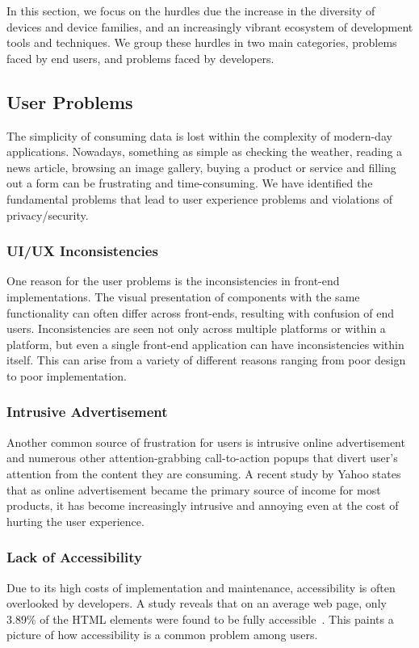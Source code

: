 In this section, we focus on the hurdles due the increase in the diversity of devices and device families, and an increasingly vibrant ecosystem of development tools and techniques. We group these hurdles in two main categories, problems faced by end users, and problems faced by developers.

\subsection{User Problems}

The simplicity of consuming data is lost within the complexity of modern-day applications. Nowadays, something as simple as checking the weather, reading a news article, browsing an image gallery, buying a product or service and filling out a form can be frustrating and time-consuming. We have identified the fundamental problems that lead to user experience problems and violations of privacy/security.

\subsubsection{UI/UX Inconsistencies}
One reason for the user problems is the inconsistencies in front-end implementations. The visual presentation of components with the same functionality can often differ across front-ends, resulting with confusion of end users. Inconsistencies are seen not only across multiple platforms or within a platform, but even a single front-end application can have inconsistencies within itself. This can arise from a variety of different reasons ranging from poor design to poor implementation.

\subsubsection{Intrusive Advertisement}
Another common source of frustration for users is intrusive online advertisement and numerous other attention-grabbing call-to-action popups that divert user's attention from the content they are consuming. A recent study by Yahoo \cite{IntrusiveAds} states that as online advertisement became the primary source of income for most products, it has become increasingly intrusive and annoying even at the cost of hurting the user experience.

\subsubsection{Lack of Accessibility}
Due to its high costs of implementation and maintenance, accessibility is often overlooked by developers. A study reveals that on an average web page, only 3.89\% of the HTML elements were found to be fully accessible~\cite{WebNotForAll}. This paints a picture of how accessibility is a common problem among users.


